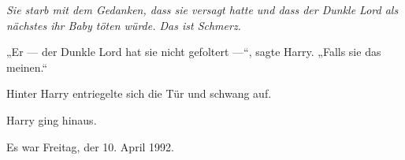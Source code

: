 \emph{Sie starb mit dem Gedanken, dass sie versagt hatte und dass der Dunkle Lord als nächstes ihr Baby töten würde. Das ist Schmerz.}

„Er — der Dunkle Lord hat sie nicht gefoltert —“, sagte Harry.
„Falls sie das meinen.“

Hinter Harry entriegelte sich die Tür und schwang auf.

Harry ging hinaus.

Es war Freitag, der 10. April 1992.

